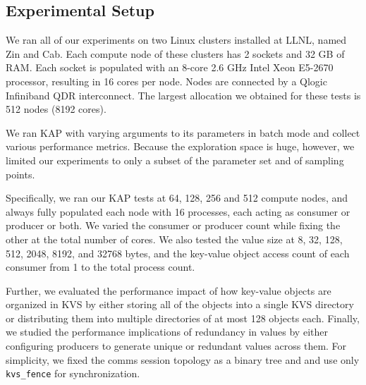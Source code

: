 \subsection{Experimental Setup}
We ran all of our experiments on two Linux clusters installed at LLNL,
named Zin and Cab.
Each compute node of these clusters has 2 sockets and 32 GB of RAM.
Each socket is populated with an 8-core 2.6 GHz Intel
Xeon E5-2670 processor, resulting in 16 cores per node.
Nodes are connected by a Qlogic Infiniband QDR interconnect.
The largest allocation we obtained for these tests is
512 nodes (8192 cores).

We ran KAP with varying arguments to its parameters
in batch mode and collect various 
performance metrics. 
Because the exploration
space is huge, however, we limited our experiments to
only a subset of the parameter set and of sampling points.

Specifically, we ran our KAP tests at 64, 128, 256 and 512
compute nodes, and always fully populated each node with
16 processes, each acting as consumer or producer or
both. We varied the consumer or producer count
while fixing the other at the total number of cores.
We also tested the value size at
8, 32, 128, 512, 2048, 8192, and 32768 bytes,
and the key-value object access count of each consumer
from 1 to the total process count.

Further, we evaluated the performance impact 
of how key-value objects are organized 
in KVS by either storing all of the objects into a single KVS directory
or distributing them into multiple directories of at most 128 objects each.
Finally, we studied the performance implications of 
redundancy in values by either configuring producers to generate
unique or redundant values across them.
For simplicity, we fixed the comms session topology as a binary tree
and and use only {\tt kvs\_fence} for synchronization.
